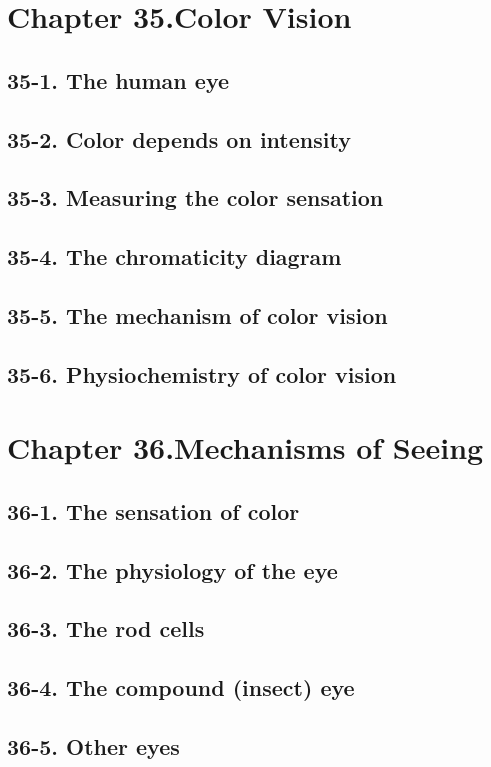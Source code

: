 \documentclass{article}
\begin{document}
\section{Chapter 35.Color Vision}
\subsection{35-1. The human eye}
\subsection{35-2. Color depends on intensity}
\subsection{35-3. Measuring the color sensation}
\subsection{35-4. The chromaticity diagram}
\subsection{35-5. The mechanism of color vision}
\subsection{35-6. Physiochemistry of color vision}
\section{Chapter 36.Mechanisms of Seeing}
\subsection{36-1. The sensation of color}
\subsection{36-2. The physiology of the eye}
\subsection{36-3. The rod cells}
\subsection{36-4. The compound (insect) eye}
\subsection{36-5. Other eyes}
\end{document}

